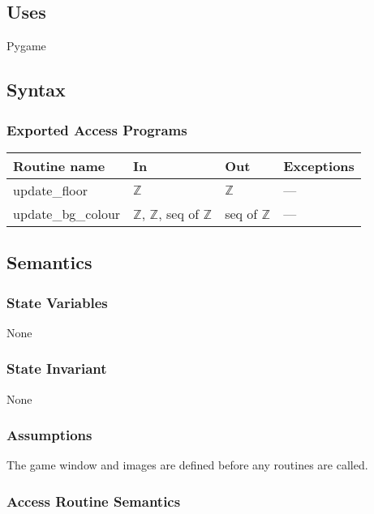 \documentclass[12pt]{article}
\begin{document}
\subsection* {Uses}
Pygame

\subsection* {Syntax}

\subsubsection* {Exported Access Programs}

\begin{tabular}{| l | l | l | l |}
\hline
\textbf{Routine name} & \textbf{In} & \textbf{Out} & \textbf{Exceptions}\\
\hline
    update\_floor & $\mathbb{Z}$ & $\mathbb{Z}$ & ---\\
\hline
    update\_bg\_colour & $\mathbb{Z}$, $\mathbb{Z}$, seq of $\mathbb{Z}$ & seq of $\mathbb{Z}$ & ---\\
\hline
\end{tabular}

\subsection* {Semantics}

\subsubsection* {State Variables}

None

\subsubsection* {State Invariant}

None

\subsubsection* {Assumptions}

The game window and images are defined before any routines are called.

\subsubsection* {Access Routine Semantics}
\end{document}
